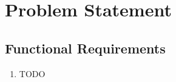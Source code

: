 \section{Problem Statement}


\subsection{Functional Requirements}

\begin{enumerate}
    \item TODO
\end{enumerate}
